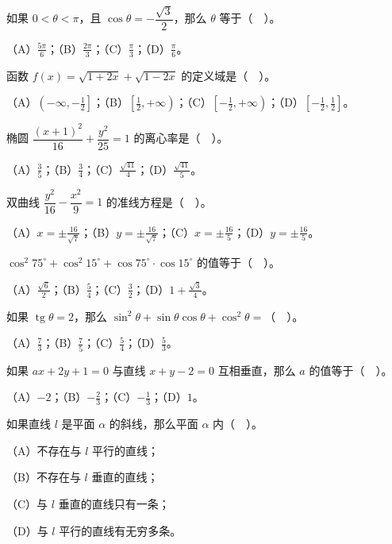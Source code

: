 \begin{question}
如果 $0<\theta<\pi$，且 $\cos\theta=-\dfrac{\sqrt3}{2}$，那么 $\theta$ 等于（　）。

（A）$\frac{5\pi}{6}$；（B）$\frac{2\pi}{3}$；（C）$\frac{\pi}{3}$；（D）$\frac{\pi}{6}$。

\end{question}
\begin{question}
函数 $f(x)=\sqrt{1+2x}+\sqrt{1-2x}$ 的定义域是（　）。

（A）$\left(-\infty,-\frac12\right]$；（B）$\left[\frac12,+\infty\right)$；（C）$\left[-\frac12,+\infty\right)$；（D）$\left[-\frac12,\frac12\right]$。

\end{question}
\begin{question}
椭圆 $\dfrac{(x+1)^2}{16}+\dfrac{y^2}{25}=1$ 的离心率是（　）。

（A）$\frac35$；（B）$\frac34$；（C）$\frac{\sqrt{41}}{4}$；（D）$\frac{\sqrt{41}}{5}$。

\end{question}
\begin{question}
双曲线 $\dfrac{y^2}{16}-\dfrac{x^2}{9}=1$ 的准线方程是（　）。

（A）$x=\pm\frac{16}{\sqrt7}$；（B）$y=\pm\frac{16}{\sqrt7}$；（C）$x=\pm\frac{16}{5}$；（D）$y=\pm\frac{16}{5}$。

\end{question}
\begin{question}
$\cos^2 75^\circ+\cos^2 15^\circ+\cos 75^\circ\cdot\cos 15^\circ$ 的值等于（　）。

（A）$\frac{\sqrt6}{2}$；（B）$\frac54$；（C）$\frac32$；（D）$1+\frac{\sqrt3}{4}$。

\end{question}
\begin{question}
如果 $\operatorname{tg}\theta=2$，那么 $\sin^2\theta+\sin\theta\cos\theta+\cos^2\theta=$（　）。

（A）$\frac73$；（B）$\frac75$；（C）$\frac54$；（D）$\frac53$。

\end{question}
\begin{question}
如果 $ax+2y+1=0$ 与直线 $x+y-2=0$ 互相垂直，那么 $a$ 的值等于（　）。

（A）$-2$；（B）$-\frac23$；（C）$-\frac13$；（D）$1$。

\end{question}
\begin{question}
如果直线 $l$ 是平面 $\alpha$ 的斜线，那么平面 $\alpha$ 内（　）。

（A）不存在与 $l$ 平行的直线；

（B）不存在与 $l$ 垂直的直线；

（C）与 $l$ 垂直的直线只有一条；

（D）与 $l$ 平行的直线有无穷多条。

\end{question}

